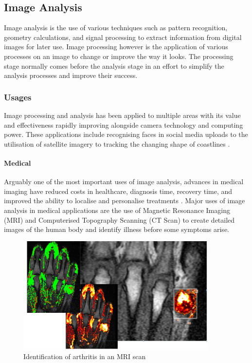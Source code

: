 \subsection{Image Analysis}
	Image analysis is the use of various techniques such as pattern recognition, geometry calculations, and signal processing to extract information from digital images for later use. Image processing however is the application of various processes on an image to change or improve the way it looks. The processing stage normally comes before the analysis stage in an effort to simplify the analysis processes and improve their success.
	\subsubsection{Usages}
	Image processing and analysis has been applied to multiple areas with its value and effectiveness rapidly improving alongside camera technology and computing power. These applications include recognising faces in social media uploads \citep{zuckerberg2011tagging} to the utilisation of satellite imagery to tracking the changing shape of coastlines \citep{costalimagery}.
	\paragraph{Medical}
	Arguably one of the most important uses of image analysis, advances in medical imaging have reduced costs in healthcare, diagnosis time, recovery time, and improved the ability to localise and personalise treatments \citep{esfmedical}. Major uses of image analysis in medical applications are the use of Magnetic Resonance Imaging (MRI) and Computerised Topography Scanning (CT Scan) to create detailed images of the human body and identify illness before some symptoms arise.
	\begin{figure}[h!]
		\centering
		\includegraphics[width=10cm]{../images/mri.jpg}
		\caption{Identification of arthritis in an MRI scan \citep{mriimage}}			
		\label{fig:mri}
	\end{figure}
